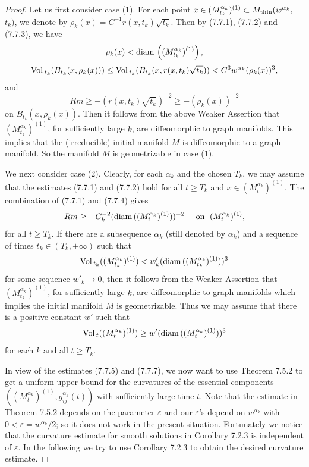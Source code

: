 \begin{proof}
Let us first consider case (1). For each point $x \in
(M^{\alpha_k}_{t_k})^{(1)} \subset M_{\rm thin}(w^{\alpha_k},$
${t_k})$, we denote by $\rho_k(x) = C^{-1}r(x,t_k)\sqrt{t_k}$.
Then by (7.7.1), (7.7.2) and (7.7.3), we have
$$
\rho_k(x) <{\rm diam}\,\left((M^{\alpha_k}_{t_k})^{(1)}\right),
$$
$$
{\rm Vol}\,_{t_k}(B_{t_k}(x,\rho_k(x))) \leq
{\rm Vol}\,_{t_k}(B_{t_k}(x,r(x,t_k)\sqrt{t_k}))<C^3w^{\alpha_k}(\rho_k(x))^3,
$$
and
$$
Rm\geq -(r(x,t_k)\sqrt{t_k})^{-2} \geq -(\rho_k(x))^{-2}
$$
on  $B_{t_k}(x,\rho_k(x)).$ Then it follows from the above Weaker
Assertion that $(M^{\alpha_k}_{t_k})^{(1)}$, for sufficiently
large $k$, are diffeomorphic to graph manifolds. This implies that
the (irreducible) initial manifold $M$ is diffeomorphic to a graph
manifold. So the manifold $M$ is geometrizable in case (1).

We next consider case (2). Clearly, for each $\alpha_k$ and the
chosen $T_k$, we may assume that the estimates (7.7.1) and (7.7.2)
hold for all $t \geq T_k$ and $x\in (M^{\alpha_k}_t)^{(1)}$. The
combination of (7.7.1) and (7.7.4) gives \begin{equation} Rm \geq
-C^{-2}_k({\rm diam}\,((M^{\alpha_k}_{t})^{(1)}))^{-2}
\quad \mbox{ on } \; (M^{\alpha_k}_{t})^{(1)}, %
\end{equation} for all $t \geq T_k$. If there are a subsequence $\alpha_k$
(still denoted by $\alpha_k$) and a sequence of times $t_k \in
(T_k,+\infty)$ such that \begin{equation}
\Vol_{t_k}((M^{\alpha_k}_{t_k})^{(1)}) <
w'_k({\rm diam}\,((M^{\alpha_k}_{t_k})^{(1)}))^3 %
\end{equation} for some sequence $w'_k \rightarrow 0$, then it follows from
the Weaker Assertion that $(M^{\alpha_k}_{t_k})^{(1)}$, for
sufficiently large $k$, are diffeomorphic to graph manifolds which
implies the initial manifold $M$ is geometrizable. Thus we may
assume that there is a positive constant $w'$ such that \begin{equation}
\Vol_t((M^{\alpha_k}_t)^{(1)})
\geq w'({\rm diam}\,((M^{\alpha_k}_t)^{(1)}))^3 %
\end{equation} for each $k$ and all $t \geq T_k$.

In view of the estimates (7.7.5) and (7.7.7), we now want to use
Theorem 7.5.2 to get a uniform upper bound  for the curvatures of
the essential components
$((M^{\alpha_k}_t)^{(1)},g^{\alpha_k}_{ij}(t))$ with sufficiently
large time $t$. Note that the estimate in Theorem 7.5.2 depends on
the parameter $\varepsilon$ and our $\varepsilon$'s depend on
$w^{\alpha_k}$ with $0<\varepsilon = {w^{\alpha_k}}/{2}$; so it
does not work in the present situation. Fortunately we notice that
the curvature estimate for smooth solutions in Corollary 7.2.3 is
independent of $\varepsilon$. In the following we try to use
Corollary 7.2.3 to obtain the desired curvature estimate.


\end{proof}
